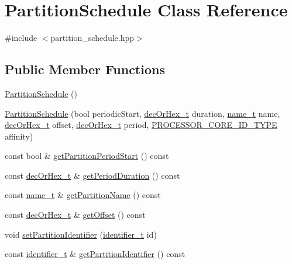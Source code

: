 \hypertarget{classPartitionSchedule}{}\section{Partition\+Schedule Class Reference}
\label{classPartitionSchedule}


{\ttfamily \#include $<$partition\+\_\+schedule.\+hpp$>$}

\subsection*{Public Member Functions}
\begin{DoxyCompactItemize}
\item 
\hyperlink{classPartitionSchedule_a8d5916b59b594532b24717f046656f40}{Partition\+Schedule} ()
\item 
\hyperlink{classPartitionSchedule_ae0f24c82435185be991616659d0174a3}{Partition\+Schedule} (bool periodic\+Start, \hyperlink{general__types_8hpp_a0edc3a86ddf4aa205c6882b61cd7b4e9}{dec\+Or\+Hex\+\_\+t} duration, \hyperlink{structname__t}{name\+\_\+t} name, \hyperlink{general__types_8hpp_a0edc3a86ddf4aa205c6882b61cd7b4e9}{dec\+Or\+Hex\+\_\+t} offset, \hyperlink{general__types_8hpp_a0edc3a86ddf4aa205c6882b61cd7b4e9}{dec\+Or\+Hex\+\_\+t} period, \hyperlink{apex__types_8h_ac081e44ca764e4d769f88a7f3bbc60de}{P\+R\+O\+C\+E\+S\+S\+O\+R\+\_\+\+C\+O\+R\+E\+\_\+\+I\+D\+\_\+\+T\+Y\+PE} affinity)
\item 
const bool \& \hyperlink{classPartitionSchedule_aeabc45c0d2707105efda9c3f2fddaf09}{get\+Partition\+Period\+Start} () const 
\item 
const \hyperlink{general__types_8hpp_a0edc3a86ddf4aa205c6882b61cd7b4e9}{dec\+Or\+Hex\+\_\+t} \& \hyperlink{classPartitionSchedule_a4bd3d3c5cc68c770dabd481de1c271d6}{get\+Period\+Duration} () const 
\item 
const \hyperlink{structname__t}{name\+\_\+t} \& \hyperlink{classPartitionSchedule_ab1f4de5cfba72f69cab435015e5b6ef5}{get\+Partition\+Name} () const 
\item 
const \hyperlink{general__types_8hpp_a0edc3a86ddf4aa205c6882b61cd7b4e9}{dec\+Or\+Hex\+\_\+t} \& \hyperlink{classPartitionSchedule_a87dbfce3c70d6e583ccfd59bd2d8fc51}{get\+Offset} () const 
\item 
void \hyperlink{classPartitionSchedule_a87a03e4b031a242b6eea0c76397c21fc}{set\+Partition\+Identifier} (\hyperlink{general__types_8hpp_a824b78b06da8112c2772bc666a63638d}{identifier\+\_\+t} id)
\item 
const \hyperlink{general__types_8hpp_a824b78b06da8112c2772bc666a63638d}{identifier\+\_\+t} \& \hyperlink{classPartitionSchedule_a0ff323aef6032cc8221516ce3507afb8}{get\+Partition\+Identifier} () const 
\end{DoxyCompactItemize}


